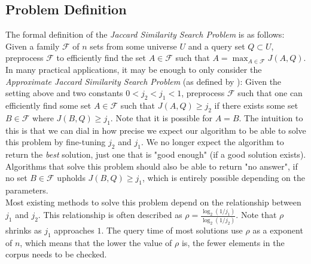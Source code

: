 \subsection{Problem Definition}
The formal definition of the \textit{Jaccard Similarity Search Problem} is as follows:
Given a family $\mathcal{F}$ of $n$ sets from some universe $U$ and a query set $Q\subset U$, preprocess $\mathcal{F}$ to efficiently find the set $A\in \mathcal{F}$ such that $A = \max_{A\in \mathcal{F}}J(A,Q)$. \\
In many practical applications, it may be enough to only consider the \textit{Approximate Jaccard Similarity Search Problem} (as defined by \citet{fast-similarity-search}): Given the setting above and two constants $0 < j_2 < j_1 < 1$, preprocess $\mathcal{F}$ such that one can efficiently find some set $A \in \mathcal{F}$ such that $J(A,Q) \geq j_2$ if there exists some set $B \in \mathcal{F}$ where $J(B,Q) \geq j_1$. Note that it is possible for $A = B$. The intuition to this is that we can dial in how precise we expect our algorithm to be able to solve this problem by fine-tuning $j_2$ and $j_1$. We no longer expect the algorithm to return the \textit{best} solution, just one that is "good enough" (if a good solution exists). Algorithms that solve this problem should also be able to return "no answer", if no set $B\in \mathcal{F}$ upholds $J(B,Q)\geq j_1$, which is entirely possible depending on the parameters. \\
Most existing methods to solve this problem depend on the relationship between $j_1$ and $j_2$. This relationship is often described as $\rho=\frac{\log_2(1/j_1)}{\log_2(1/j_2)}$. Note that $\rho$ shrinks as $j_1$ approaches $1$. The query time of most solutions use $\rho$ as a exponent of $n$, which means that the lower the value of $\rho$ is, the fewer elements in the corpus needs to be checked.

